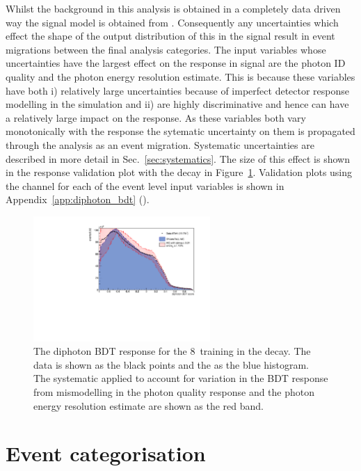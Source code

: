Whilst the background in this analysis is obtained in a completely data driven way the signal model is obtained from \MC. Consequently any uncertainties which effect the shape of the output distribution of this \BDT in the signal result in event migrations between the final analysis categories. The input variables whose uncertainties have the largest effect on the \BDT response in signal are the photon ID quality and the photon energy resolution estimate. This is because these variables have both i) relatively large uncertainties because of imperfect detector response modelling in the simulation and ii) are highly discriminative and hence can have a relatively large impact on the \BDT response. As these variables both vary monotonically with the \BDT response the sytematic uncertainty on them is propagated through the analysis as an event migration. Systematic uncertainties are described in more detail in Sec.~\ref{sec:systematics}. The size of this effect is shown in the \BDT response validation plot with the \Zee decay in Figure~\ref{fig:diphotonBDT_zee}. Validation plots using the \Zee channel for each of the event level \BDT input variables is shown in Appendix~\ref{app:diphoton_bdt} ().

\begin{figure}
  \includegraphics[width=0.6\textwidth]{ch4_selec_and_cats/plots/diphoBDT_8TeV_zee.pdf}
  \caption{The diphoton BDT response for the 8~\TeV training in the \Zee decay. The data is shown as the black points and the \MC as the blue histogram. The systematic applied to account for variation in the BDT response from mismodelling in the photon quality response and the photon energy resolution estimate are shown as the red band. }
  \label{fig:diphotonBDT_zee}
\end{figure}

\section{Event categorisation}
\label{sec:categorisation}

